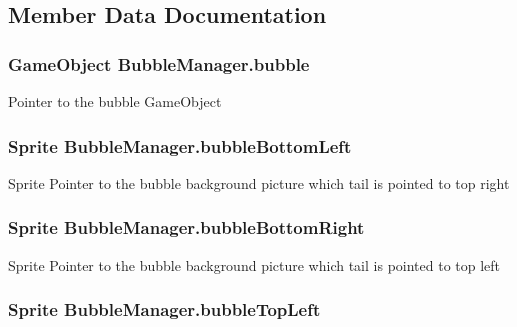 \subsection{Member Data Documentation}
\subsubsection[{\texorpdfstring{bubble}{bubble}}]{\setlength{\rightskip}{0pt plus 5cm}Game\+Object Bubble\+Manager.\+bubble}\hypertarget{class_bubble_manager_a695c03d55290b06d575b33ea6457881a}{}\label{class_bubble_manager_a695c03d55290b06d575b33ea6457881a}


Pointer to the bubble Game\+Object 

\subsubsection[{\texorpdfstring{bubble\+Bottom\+Left}{bubbleBottomLeft}}]{\setlength{\rightskip}{0pt plus 5cm}Sprite Bubble\+Manager.\+bubble\+Bottom\+Left}\hypertarget{class_bubble_manager_a17c953ad296ced986643535f4a736cdd}{}\label{class_bubble_manager_a17c953ad296ced986643535f4a736cdd}


Sprite Pointer to the bubble background picture which tail is pointed to top right 

\subsubsection[{\texorpdfstring{bubble\+Bottom\+Right}{bubbleBottomRight}}]{\setlength{\rightskip}{0pt plus 5cm}Sprite Bubble\+Manager.\+bubble\+Bottom\+Right}\hypertarget{class_bubble_manager_ab8f69b885d62fcb4411ccaeeed4617d9}{}\label{class_bubble_manager_ab8f69b885d62fcb4411ccaeeed4617d9}


Sprite Pointer to the bubble background picture which tail is pointed to top left 

\subsubsection[{\texorpdfstring{bubble\+Top\+Left}{bubbleTopLeft}}]{\setlength{\rightskip}{0pt plus 5cm}Sprite Bubble\+Manager.\+bubble\+Top\+Left}\hypertarget{class_bubble_manager_a7fd323149c28ab5289e9292349f8f41e}{}\label{class_bubble_manager_a7fd323149c28ab5289e9292349f8f41e}


